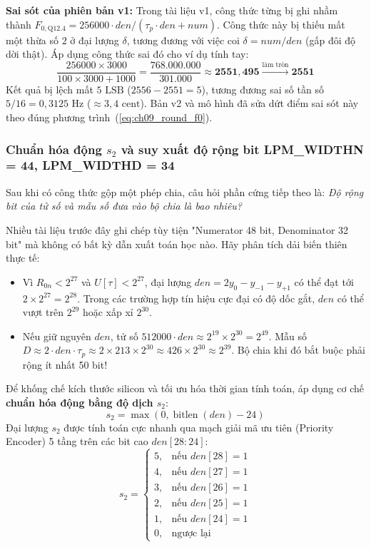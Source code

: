 \textbf{Sai sót của phiên bản v1:} Trong tài liệu v1, công thức từng bị ghi nhầm thành $F_{0, \text{Q12.4}} = 256000 \cdot den / (\tau_p \cdot den + num)$. Công thức này bị thiếu mất một thừa số $2$ ở đại lượng $\delta$, tương đương với việc coi $\delta = num / den$ (gấp đôi độ dời thật). Áp dụng công thức sai đó cho ví dụ tính tay:
\begin{equation}
\frac{256000 \times 3000}{100 \times 3000 + 1000} = \frac{768.000.000}{301.000} \approx \mathbf{2551{,}495} \xrightarrow{\text{làm tròn}} \mathbf{2551}
\end{equation}
Kết quả bị lệch mất $5\text{ LSB}$ ($2556 - 2551 = 5$), tương đương sai số tần số $5/16 = 0{,}3125\text{ Hz}$ ($\approx 3{,}4\text{ cent}$). Bản v2 và mô hình  đã sửa dứt điểm sai sót này theo đúng phương trình~(\ref{eq:ch09_round_f0}).

\subsubsection*{Chuẩn hóa động $s_2$ và suy xuất độ rộng bit LPM\_WIDTHN = 44, LPM\_WIDTHD = 34}
Sau khi có công thức gộp một phép chia, câu hỏi phần cứng tiếp theo là: \emph{Độ rộng bit của tử số và mẫu số đưa vào bộ chia là bao nhiêu?}

Nhiều tài liệu trước đây ghi chép tùy tiện "Numerator 48 bit, Denominator 32 bit" mà không có bất kỳ dẫn xuất toán học nào. Hãy phân tích dải biến thiên thực tế:
\begin{itemize}[leftmargin=1.5em, itemsep=2pt]
    \item Vì $R_{0n} < 2^{27}$ và $U[\tau] < 2^{27}$, đại lượng $den = 2y_0 - y_{-1} - y_{+1}$ có thể đạt tới $2 \times 2^{27} = 2^{28}$. Trong các trường hợp tín hiệu cực đại có độ dốc gắt, $den$ có thể vượt trên $2^{29}$ hoặc xấp xỉ $2^{30}$.
    \item Nếu giữ nguyên $den$, tử số $512000 \cdot den \approx 2^{19} \times 2^{30} = 2^{49}$. Mẫu số $D \approx 2 \cdot den \cdot \tau_p \approx 2 \times 213 \times 2^{30} \approx 426 \times 2^{30} \approx 2^{39}$. Bộ chia khi đó bắt buộc phải rộng ít nhất 50 bit!
\end{itemize}

Để khống chế kích thước silicon và tối ưu hóa thời gian tính toán,  áp dụng cơ chế \textbf{chuẩn hóa động bằng độ dịch $s_2$}:
\begin{equation}
s_2 = \max(0, \operatorname{bitlen}(den) - 24)
\end{equation}
Đại lượng $s_2$ được tính toán cực nhanh qua mạch giải mã ưu tiên (Priority Encoder) 5 tầng trên các bit cao $den[28:24]$:
\begin{equation}
s_2 = \begin{cases}
5, & \text{nếu } den[28] = 1 \\
4, & \text{nếu } den[27] = 1 \\
3, & \text{nếu } den[26] = 1 \\
2, & \text{nếu } den[25] = 1 \\
1, & \text{nếu } den[24] = 1 \\
0, & \text{ngược lại}
\end{cases}
\end{equation}

